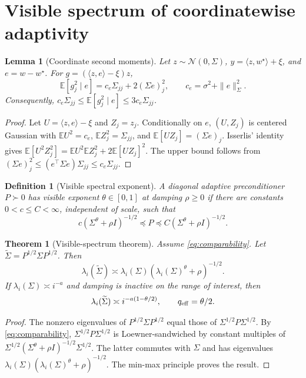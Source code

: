 \documentclass{article}
\newtheorem{theorem}{Theorem}
\newtheorem{lemma}{Lemma}
\newtheorem{definition}{Definition}
\newcommand{\E}{\mathbb{E}}
\newcommand{\pre}{\preceq}
\newcommand{\tSig}{\widetilde\Sigma}
\begin{document}
\section{Visible spectrum of coordinatewise adaptivity}
\begin{lemma}[Coordinate second moments]
\label{lem:grad-second}
Let $z\sim\mathcal N(0,\Sigma)$, $y=\langle z,w^\star\rangle+\xi$, and $e=w-w^\star$.  For $g=(\langle z,e\rangle-\xi)z$,
\[
    \E[g_j^2\mid e]=c_e\Sigma_{jj}+2(\Sigma e)_j^2,
    \qquad c_e=\sigma^2+\|e\|_\Sigma^2.
\]
Consequently, $c_e\Sigma_{jj}\le \E[g_j^2\mid e]\le3c_e\Sigma_{jj}$.
\end{lemma}
\begin{proof}
Let $U=\langle z,e\rangle-\xi$ and $Z_j=z_j$.  Conditionally on $e$, $(U,Z_j)$ is centered Gaussian with $\E U^2=c_e$, $\E Z_j^2=\Sigma_{jj}$, and $\E[UZ_j]=(\Sigma e)_j$.  Isserlis' identity gives $\E[U^2Z_j^2]=\E U^2\E Z_j^2+2\E[UZ_j]^2$.  The upper bound follows from $(\Sigma e)_j^2\le(e^\top\Sigma e)\Sigma_{jj}\le c_e\Sigma_{jj}$.
\end{proof}

\begin{definition}[Visible spectral exponent]
\label{def:visible}
A diagonal adaptive preconditioner $P\succ0$ has visible exponent $\theta\in[0,1]$ at damping $\rho\ge0$ if there are constants $0<c\le C<\infty$, independent of scale, such that
\begin{equation}
\label{eq:comparability}
    c(\Sigma^\theta+\rho I)^{-1/2}\pre P\pre C(\Sigma^\theta+\rho I)^{-1/2}.
\end{equation}
\end{definition}

\begin{theorem}[Visible-spectrum theorem]
\label{thm:visible-spectrum}
Assume \eqref{eq:comparability}.  Let $\tSig=P^{1/2}\Sigma P^{1/2}$.  Then
\[
    \lambda_i(\tSig)\asymp\lambda_i(\Sigma)(\lambda_i(\Sigma)^\theta+\rho)^{-1/2}.
\]
If $\lambda_i(\Sigma)\asymp i^{-a}$ and damping is inactive on the range of interest, then
\[
    \lambda_i(\tSig)\asymp i^{-a(1-\theta/2)},\qquad q_{\rm eff}=\theta/2.
\]
\end{theorem}
\begin{proof}
The nonzero eigenvalues of $P^{1/2}\Sigma P^{1/2}$ equal those of $\Sigma^{1/2}P\Sigma^{1/2}$.  By \eqref{eq:comparability}, $\Sigma^{1/2}P\Sigma^{1/2}$ is Loewner-sandwiched by constant multiples of $\Sigma^{1/2}(\Sigma^\theta+\rho I)^{-1/2}\Sigma^{1/2}$.  The latter commutes with $\Sigma$ and has eigenvalues $\lambda_i(\Sigma)(\lambda_i(\Sigma)^\theta+\rho)^{-1/2}$.  The min-max principle proves the result.
\end{proof}
\end{document}
